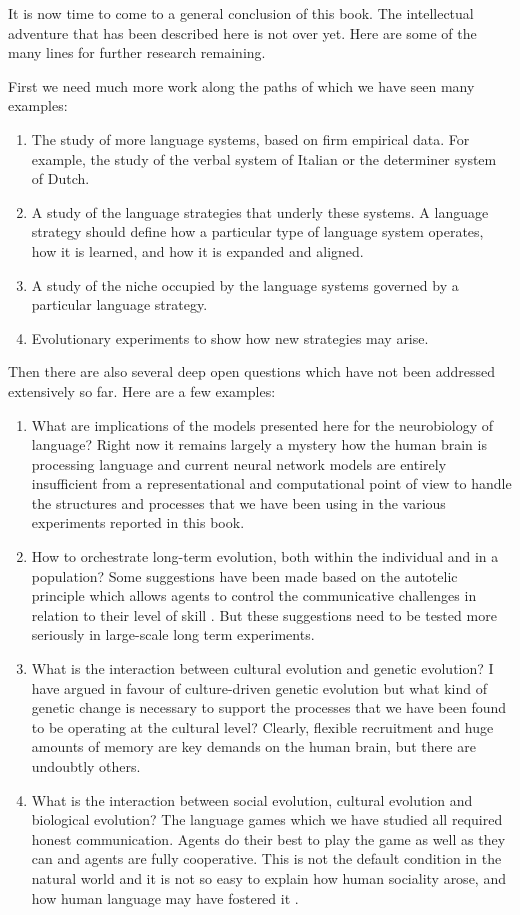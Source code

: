 It is now time to come to a general conclusion of this book. The intellectual adventure that has been described here 
is not over yet.  Here are some of the many lines for further research remaining. 

First we need much more work along the paths of which we have seen many examples: 
\begin{enumerate}
\item The study of more language systems, based on firm empirical data. For example, the study of the verbal system of 
Italian or the determiner system of Dutch. 
\item A study of the language strategies that underly these systems. A language strategy should define how a particular 
type of language system operates, how it is learned, and how it is expanded and aligned. 
\item A study of the niche occupied by the language systems governed by a particular language strategy. 
\item Evolutionary experiments to show how new strategies may arise. 
\end{enumerate} 
Then there are also several deep open questions which have not been addressed extensively so far. Here are a few examples: 
\begin{enumerate}
\item What are implications of the models presented here for the neurobiology of language? Right now it remains largely 
a mystery how the human brain is processing language and current neural network models are entirely insufficient from 
a representational and computational point of view to handle the structures and processes that we have been using in 
the various experiments reported in this book. 
\item How to orchestrate long-term evolution, both within the individual and in a population? Some suggestions have been 
made based on the autotelic principle which allows agents to control the communicative challenges in 
relation to their level of skill \citep{Steels:2007}. 
But these suggestions need to be tested
more seriously in large-scale long term experiments. 
\item What is the interaction between cultural evolution and genetic evolution? I have argued in favour of culture-driven genetic
evolution but what kind of genetic change is necessary to support the processes that we have been found to 
be operating at the cultural level? Clearly, flexible recruitment and huge amounts of memory are key demands on the 
human brain, but there are undoubtly others. 
\item What is the interaction between social evolution, cultural evolution and biological evolution? The language 
games which we have studied all required honest communication. Agents do their best to play the game as well as they 
can and agents are fully cooperative. This is not the default condition in the natural world and it is not so easy 
to explain how human sociality arose, and how human language may have fostered it \citep{Dor:2014}. 
\end{enumerate}
